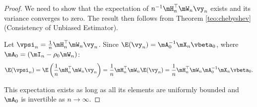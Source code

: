 \documentclass[english,12pt]{book}\usepackage[]{graphicx}\usepackage[]{xcolor}
\begin{document}
\begin{proof}\label{proof:consistency-plimHQ}
We need to show that the expectation of $n^{-1}\mH_n^\top\mW_n\vy_n$ exists and its variance converges to zero. The result then follows from Theorem \ref{teo:chebyshev} (Consistency of Unbiased Estimator).

Let $\vpsi_n = \frac{1}{n}\mH_n^\top\mW_n\vy_n$. Since $\E(\vy_n) = \mA_0^{-1}\mX_n\vbeta_0$, where $\mA_0 = \left(\mI_n - \rho_0\mW_n\right)$:
\begin{equation*}
\E(\vpsi_n) =\E\left(\frac{1}{n}\mH_n^\top\mW_n\vy_n\right) = \frac{1}{n}\mH_n^\top\mW_n\E(\vy_n) = \frac{1}{n}\mH_n^\top\mW_n\mA_0^{-1}\mX_n\vbeta_0.
\end{equation*}

This expectation exists as long as all its elements are uniformly bounded and $\mA_0$ is invertible as $n\to\infty$. 


\end{proof}
\end{document}
